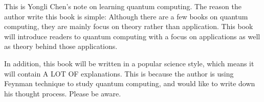 
\begin{fullwidth}

This is Yongli Chen's note on learning quantum computing. 
The reason the author write this book is simple: Although there are a few books on quantum computing, they are mainly focus on theory rather than application.
This book will introduce readers to quantum computing with a focus on applications as well as theory behind those applications.

In addition, this book will be written in a popular science style, which means it will contain A LOT OF explanations. 
This is because the author is using Feynman technique to study quantum computing, and would like to write down his thought process.
Please be aware.

\end{fullwidth}